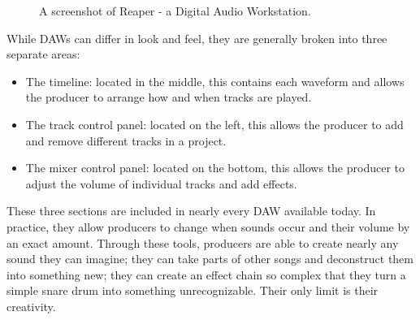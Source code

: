 \begin{figure}[h] %
	\begin{center}
		\caption{A screenshot of Reaper - a Digital Audio Workstation.}
	\end{center}
\end{figure}

While DAWs can differ in look and feel, they are generally broken into three separate areas:

\begin{itemize}
  \item The timeline: located in the middle, this contains each waveform and allows the producer to arrange how and when tracks are played.
  \item The track control panel: located on the left, this allows the producer to add and remove different tracks in a project.
  \item The mixer control panel: located on the bottom, this allows the producer to adjust the volume of individual tracks and add effects.
\end{itemize}

These three sections are included in nearly every DAW available today. In practice, they allow producers to change when sounds occur and their volume by an exact amount. Through these tools, producers are able to create nearly any sound they can imagine; they can take parts of other songs and deconstruct them into something new; they can create an effect chain so complex that they turn a simple snare drum into something unrecognizable. Their only limit is their creativity.
